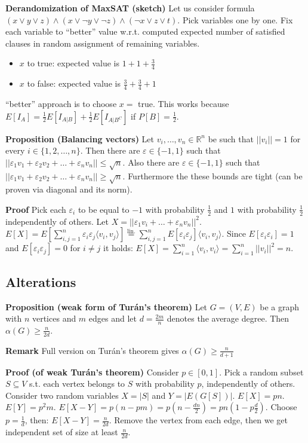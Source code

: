 \documentclass[a4paper]{article}
\begin{document}
\textbf{Derandomization of MaxSAT (sketch)}
Let us consider formula $(x \lor y \lor z) \land (x \lor \lnot y \lor \lnot z) \land (\lnot x \lor z \lor t)$.
Pick variables one by one.
Fix each variable to ``better'' value w.r.t. computed expected number of satisfied clauses in random assignment of remaining variables.
\begin{itemize}
	\item $x$ to true: expected value is $1+1+\frac{3}{4}$
	\item $x$ to false: expected value is $\frac{3}{4} + \frac{3}{4} + 1$
\end{itemize}
``better'' approach is to choose $x =$ true.
This works because $E[I_A] = \frac{1}{2} E[I_{A|B}] + \frac{1}{2} E[I_{A|B^C}]$ if $P[B] = \frac{1}{2}$.

\textbf{Proposition (Balancing vectors)}
Let $v_i, \ldots, v_n \in \mathbb{R}^n$ be such that $||v_i|| = 1$ for every $i \in \{1,2,\ldots,n\}$.
Then there are $\varepsilon \in \{-1,1\}$ such that $||\varepsilon_1v_1 + \varepsilon_2v_2 + \ldots + \varepsilon_nv_n|| \leq \sqrt{n}$.
Also there are $\varepsilon \in \{-1,1\}$ such that $||\varepsilon_1v_1 + \varepsilon_2v_2 + \ldots + \varepsilon_nv_n|| \geq \sqrt{n}$.
Furthermore the these bounds are tight (can be proven via diagonal and its norm).

\textbf{Proof}
Pick each $\varepsilon_i$ to be equal to $-1$ with probability $\frac{1}{2}$ and $1$ with probability $\frac{1}{2}$ independently of others.
Let $X = ||\varepsilon_1v_i + \ldots + \varepsilon_nv_n||^2$.
$E[X] = E[\sum_{i,j = 1}^n \varepsilon_i \varepsilon_j \langle v_i, v_j \rangle] \stackrel{\text{lin.}}{=} \sum_{i,j = 1}^n E[\varepsilon_i \varepsilon_j] \langle v_i, v_j \rangle$.
Since $E[\varepsilon_i \varepsilon_i] = 1$ and $E[\varepsilon_i \varepsilon_j] = 0$ for $i \neq j$ it holds:
$E[X] = \sum_{i=1}^n \langle v_i, v_i \rangle = \sum_{i=1}^n ||v_i||^2 = n$.

\subsection*{Alterations}

\textbf{Proposition (weak form of Turán's theorem)}
Let $G = (V,E)$ be a graph with $n$ vertices and $m$ edges and let $d = \frac{2m}{n}$ denotes the average degree.
Then $\alpha (G) \geq \frac{n}{2d}$.

\textbf{Remark}
Full version on Turán's theorem gives $\alpha (G) \geq \frac{n}{d+1}$

\textbf{Proof (of weak Turán's theorem)}
Consider $p \in [0,1]$.
Pick a random subset $S \subseteq V$ s.t. each vertex belongs to $S$ with probability $p$, independently of others.
Consider two random variables $X = |S|$ and $Y = |E(G[S])|$.
$E[X] = pn$.
$E[Y] = p^2m$.
$E[X-Y] = p(n - pm) = p(n - \frac{dn}{2}) = pn(1-p\frac{d}{2})$.
Choose $p = \frac{1}{d}$, then:
$E[X-Y] = \frac{n}{2d}$.
Remove the vertex from each edge, then we get independent set of size at least $\frac{n}{2d}$.
\end{document}
